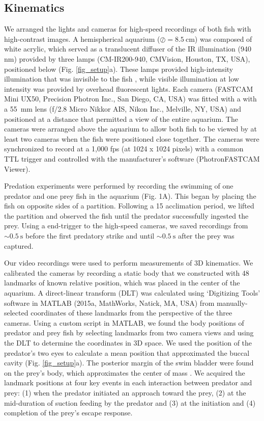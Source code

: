 \documentclass[]{rsos}%
\begin{document}
\subsection{Kinematics}
We arranged the lights and cameras for high-speed recordings of both fish with high-contrast images. 
A hemispherical aquarium ($\oslash = \SI{8.5}{\cm}$) was composed of white acrylic, which served as a translucent diffuser of the IR illumination (940 nm) provided by three lamps (CM-IR200-940, CMVision, Houston, TX, USA), positioned below (Fig. \ref{fig_setup}a). 
These lamps provided high-intensity illumination that was invisible to the fish \cite{Robinson:1993tu}, while visible illumination at low intensity was provided by overhead fluorescent lights.
Each camera (FASTCAM Mini UX50, Precision Photron Inc., San Diego, CA, USA) was fitted with a with a \SI{55}{\mm} lens (f/2.8 Micro Nikkor AIS, Nikon Inc., Melville, NY, USA) and positioned at a distance that permitted a view of the entire aquarium. 
The cameras were arranged above the aquarium to allow both fish to be viewed by at least two cameras when the fish were positioned close together.
The cameras were synchronized to record at a 1,000 fps (at 1024 x 1024 pixels) with a common TTL trigger and controlled with the manufacturer's software (PhotronFASTCAM Viewer).

Predation experiments were performed by recording the swimming of one predator and one prey fish in the aquarium (Fig. 1A). 
This began by placing the fish on opposite sides of a partition.
Following a \SI{15}{\min} acclimation period, we lifted the partition and observed the fish until the predator successfully ingested the prey.
Using a end-trigger to the high-speed cameras, we saved recordings from $\sim \SI{0.5}{\s}$ before the first predatory strike and until $\sim \SI{0.5}{\s}$  after the prey was captured.

Our video recordings were used to perform measurements of 3D kinematics. 
We calibrated the cameras by recording a static body that we constructed with 48 landmarks of known relative position, which was placed in the center of the aquarium.
A direct-linear transform (DLT) was calculated using `Digitizing Tools' software in MATLAB (2015a, MathWorks, Natick, MA, USA) \cite{Hedrick:2008wz} from manually-selected coordinates of these landmarks from the perspective of the three cameras.
Using a custom script in MATLAB, we found the body positions of predator and prey fish by selecting landmarks from two camera views and using the DLT to determine the coordinates in 3D space.
We used the position of the predator's two eyes to calculate a mean position that approximated the buccal cavity (Fig. \ref{fig_setup}a).
The posterior margin of the swim bladder were found on the prey's body, which approximates the center of mass \cite{Stewart:2010ig}.
We acquired the landmark positions at four key events in each interaction between predator and prey: (1) when the predator initiated an approach toward the prey, (2) at the mid-duration of suction feeding by the predator and (3) at the initiation and (4) completion of the prey's escape response.
\end{document}
